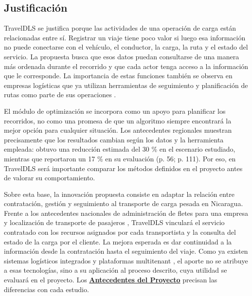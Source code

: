 \subsection{Justificación}
\label{sec:justificacion}

TravelDLS se justifica porque las actividades de una operación de carga están relacionadas entre sí. Registrar un viaje tiene poco valor si luego esa información no puede conectarse con el vehículo, el conductor, la carga, la ruta y el estado del servicio. La propuesta busca que esos datos puedan consultarse de una manera más ordenada durante el recorrido y que cada actor tenga acceso a la información que le corresponde. La importancia de estas funciones también se observa en empresas logísticas que ya utilizan herramientas de seguimiento y planificación de rutas como parte de sus operaciones \parencite[p. 988]{pauzuoliene2024smart}.

El módulo de optimización se incorpora como un apoyo para planificar los recorridos, no como una promesa de que un algoritmo siempre encontrará la mejor opción para cualquier situación. Los antecedentes regionales muestran precisamente que los resultados cambian según los datos y la herramienta empleada: \textcite{aguilar2022optimizacion} obtuvo una reducción estimada del 30 \% en el escenario estudiado, mientras que \textcite{hernandez2024evaluacion} reportaron un 17 \% en su evaluación (p. 56; p. 111). Por eso, en TravelDLS será importante comparar los métodos definidos en el proyecto antes de valorar su comportamiento.

Sobre esta base, la innovación propuesta consiste en adaptar la relación entre contratación, gestión y seguimiento al transporte de carga pesada en Nicaragua. Frente a los antecedentes nacionales de administración de fletes para una empresa y localización de transporte de pasajeros \parencite{aragon2018implementacion,garcia2022desarrollo}, TravelDLS vinculará el servicio contratado con los recursos asignados por cada transportista y la consulta del estado de la carga por el cliente. La mejora esperada es dar continuidad a la información desde la contratación hasta el seguimiento del viaje. Como ya existen sistemas logísticos integrados y plataformas multitenant \parencite{sultan2022real,lasluisa2026diseno}, el aporte no se atribuye a esas tecnologías, sino a su aplicación al proceso descrito, cuya utilidad se evaluará en el proyecto. Los \textbf{\hyperref[sec:antecedentes-proyecto]{Antecedentes del Proyecto}} precisan las diferencias con cada estudio.

